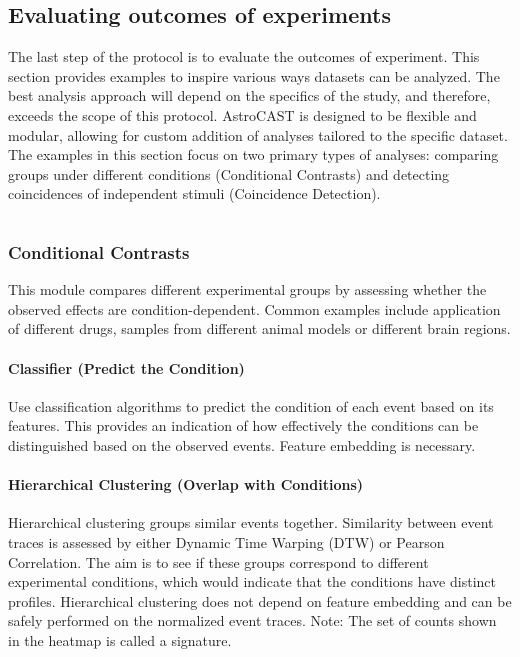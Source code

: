
\subsection{Evaluating outcomes of experiments}

The last step of the protocol is to evaluate the outcomes of experiment. This section provides examples to inspire various ways datasets can be analyzed. The best analysis approach will depend on the specifics of the study, and therefore, exceeds the scope of this protocol. AstroCAST is designed to be flexible and modular, allowing for custom addition of analyses tailored to the specific dataset. The examples in this section focus on two primary types of analyses: comparing groups under different conditions (Conditional Contrasts) and detecting coincidences of independent stimuli (Coincidence Detection).

\begin{lstlisting}[style=pyStyle]

\end{lstlisting}

\subsubsection{Conditional Contrasts}
This module compares different experimental groups by assessing whether the observed effects are condition-dependent. Common examples include application of different drugs, samples from different animal models or different brain regions.

\paragraph{Classifier (Predict the Condition)}
Use classification algorithms to predict the condition of each event based on its features. This provides an indication of how effectively the conditions can be distinguished based on the observed events. Feature embedding is necessary.


\paragraph{Hierarchical Clustering (Overlap with Conditions)}
Hierarchical clustering groups similar events together. Similarity between event traces is assessed by either Dynamic Time Warping (DTW) or Pearson Correlation. The aim is to see if these groups correspond to different experimental conditions, which would indicate that the conditions have distinct profiles. Hierarchical clustering does not depend on feature embedding and can be safely performed on the normalized event traces. Note: The set of counts shown in the heatmap is called a signature.

